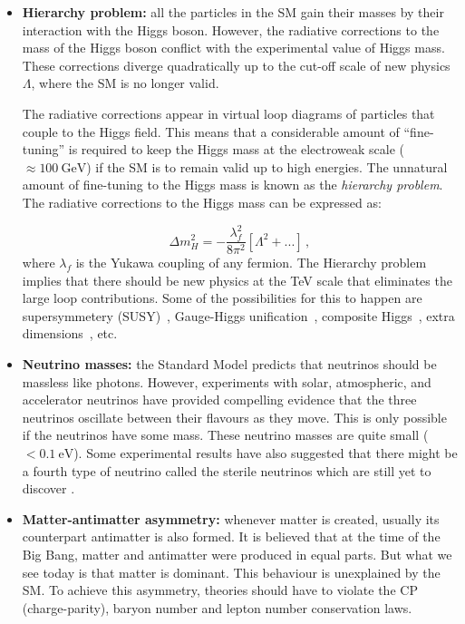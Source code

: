 \begin{itemize}
\item \textbf{Hierarchy problem:} all the particles in the SM gain their masses by their interaction with the Higgs boson. However, the radiative corrections to the mass of the Higgs boson conflict with the experimental value of Higgs mass. These corrections diverge quadratically  up to the cut-off scale of new physics $\Lambda$, where the SM is no longer valid.

The radiative corrections appear in virtual loop diagrams of particles that couple to the Higgs field. This means that a considerable amount of \enquote{fine-tuning} is required to keep the Higgs mass at the electroweak scale ($\approx\SI{100}{\giga\electronvolt}$) if the SM is to remain valid up to high energies. The unnatural amount of fine-tuning to the Higgs mass is known as the \textit{hierarchy problem}. The radiative corrections to the Higgs mass can be expressed as:

\begin{equation}
	\Delta m_{H}^{2} = -\frac{\lambda^{2}_{f}}{8\pi^{2}} \left[\Lambda^{2} + ... \right] \,,
\end{equation}
where $\lambda_{f}$ is the Yukawa coupling of any fermion. The Hierarchy problem implies that there should be new physics at the \si{\tera\electronvolt} scale that eliminates the large loop contributions. Some of the possibilities for this to happen are supersymmetery (SUSY)~\cite{hierarchy2}, Gauge-Higgs unification~\cite{gaugehiggs}, composite Higgs~\cite{hierarchy2}, extra dimensions~\cite{extradim}, etc.

\item \textbf{Neutrino masses:} the Standard Model predicts that neutrinos should be massless like photons. However, experiments with solar, atmospheric, and accelerator neutrinos have provided compelling evidence that the three neutrinos oscillate between their flavours as they move. This is only possible if the neutrinos have some mass. These neutrino masses are quite small ($<\SI{0.1}{\electronvolt}$). Some experimental results have also suggested that there might be a fourth type of neutrino called the sterile neutrinos which are still yet to discover \cite{neutrinomass}.

\item \textbf{Matter-antimatter asymmetry:} whenever matter is created, usually its counterpart antimatter is also formed. It is believed that at the time of the Big Bang, matter and antimatter were produced in equal parts. But what we see today is that matter is dominant. This behaviour is unexplained by the SM. To achieve this asymmetry, theories should have to violate the CP (charge-parity), baryon number and lepton number conservation laws.


\end{itemize}
